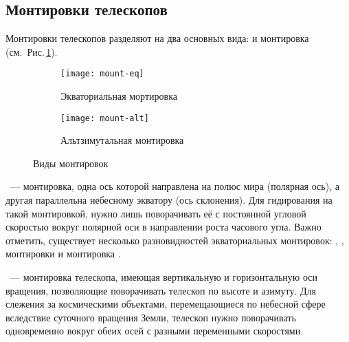 \subsection{Монтировки телескопов}
Монтировки телескопов разделяют на два основных вида:  и  монтировка (см.~Рис.\,\ref{mounts}).
\begin{figure}[h]
	\centering
	\hspace*{.4cm}
	\begin{subfigure}{0.48\textwidth}
		\texttt{[image: mount-eq]}
		\caption{Экваториальная мортировка}
	 \end{subfigure}
	\hspace*{.4cm}
	\begin{subfigure}{0.41\textwidth}
		\texttt{[image: mount-alt]}
		\caption{Альтзимутальная монтировка}
	 \end{subfigure}
	 \hspace*{.4cm}
	 \caption{Виды монтировок}
	 \label{mounts}
\end{figure}

~--- монтировка, одна ось которой направлена на полюс мира (полярная ось), а другая параллельна небесному экватору (ось склонения). Для гидирования на такой монтировкой, нужно лишь поворачивать её с постоянной угловой скоростью вокруг полярной оси в направлении роста часового угла. Важно отметить, существует несколько разновидностей экваториальных монтировок: , ,  монтировки и монтировка .

~--- монтировка телескопа, имеющая вертикальную и горизонтальную оси вращения, позволяющие поворачивать телескоп по высоте и азимуту. Для слежения за космическими объектами, перемещающиеся по небесной сфере вследствие суточного вращения Земли, телескоп нужно поворачивать одновременно вокруг обеих осей с разными переменными скоростями.